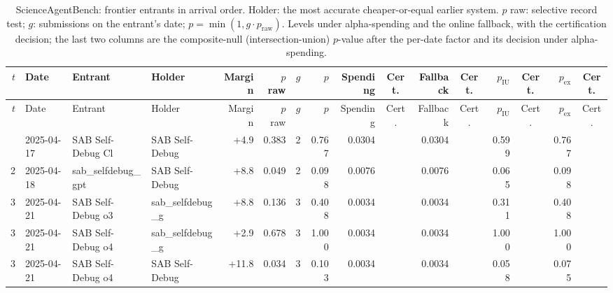 {\begin{longtable}{rlllrrrrrcrcrcrc}
\caption{ScienceAgentBench: frontier entrants in arrival order. Holder: the most accurate cheaper-or-equal earlier system. $p$ raw: selective record test; $g$: submissions on the entrant's date; $p = \min(1, g \cdot p_{\mathrm{raw}})$. Levels under alpha-spending and the online fallback, with the certification decision; the last two columns are the composite-null (intersection-union) $p$-value after the per-date factor and its decision under alpha-spending.}\label{tab:supp-cert-hal_scienceagentbench}\\
\toprule
$t$ & Date & Entrant & Holder & Margin & $p$ raw & $g$ & $p$ & Spending & Cert. & Fallback & Cert. & $p_{\mathrm{IU}}$ & Cert. & $p_{\mathrm{ex}}$ & Cert. \\
\midrule
\endfirsthead
\toprule
$t$ & Date & Entrant & Holder & Margin & $p$ raw & $g$ & $p$ & Spending & Cert. & Fallback & Cert. & $p_{\mathrm{IU}}$ & Cert. & $p_{\mathrm{ex}}$ & Cert. \\
\midrule
\endhead
\bottomrule
\endfoot
1 & 2025-04-17 & SAB Self-Debug Cl~ & SAB Self-Debug ~ & +4.9 & 0.383 & 2 & 0.767 & 0.0304 &  & 0.0304 &  & 0.599 &  & 0.767 &  \\
2 & 2025-04-18 & sab\_selfdebug\_gpt~ & SAB Self-Debug ~ & +8.8 & 0.049 & 2 & 0.098 & 0.0076 &  & 0.0076 &  & 0.065 &  & 0.098 &  \\
3 & 2025-04-21 & SAB Self-Debug o3~ & sab\_selfdebug\_g~ & +8.8 & 0.136 & 3 & 0.408 & 0.0034 &  & 0.0034 &  & 0.311 &  & 0.408 &  \\
3 & 2025-04-21 & SAB Self-Debug o4~ & sab\_selfdebug\_g~ & +2.9 & 0.678 & 3 & 1.000 & 0.0034 &  & 0.0034 &  & 1.000 &  & 1.000 &  \\
3 & 2025-04-21 & SAB Self-Debug o4~ & SAB Self-Debug ~ & +11.8 & 0.034 & 3 & 0.103 & 0.0034 &  & 0.0034 &  & 0.058 &  & 0.075 &  \\
\end{longtable}

}
